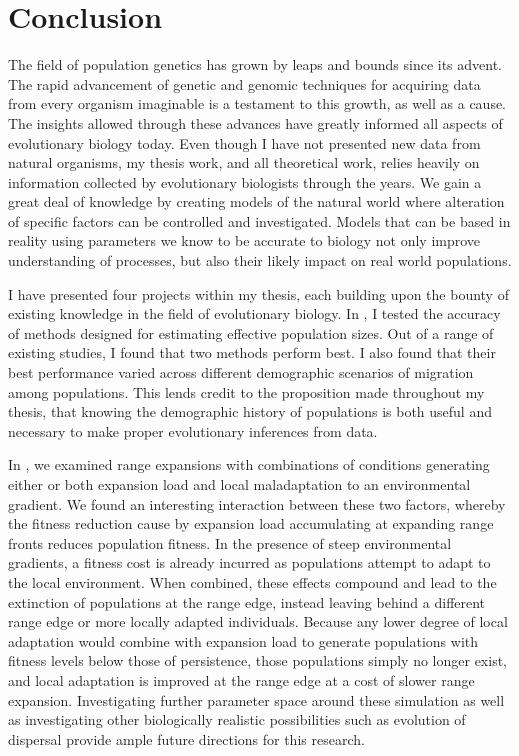 \chapter{Conclusion}
\label{chap:conclusions}

The field of population genetics has grown by leaps and bounds since its advent. The rapid advancement of genetic and genomic techniques for acquiring data from every organism imaginable is a testament to this growth, as well as a cause. The insights allowed through these advances have greatly informed all aspects of evolutionary biology today. Even though I have not presented new data from natural organisms, my thesis work, and all theoretical work, relies heavily on information collected by evolutionary biologists through the years. We gain a great deal of knowledge by creating models of the natural world where alteration of specific factors can be controlled and investigated. Models that can be based in reality using parameters we know to be accurate to biology not only improve understanding of processes, but also their likely impact on real world populations.

I have presented four projects within my thesis, each building upon the bounty of existing knowledge in the field of evolutionary biology. In , I tested the accuracy of methods designed for estimating effective population sizes. Out of a range of existing studies, I found that two methods perform best. I also found that their best performance varied across different demographic scenarios of migration among populations. This lends credit to the proposition made throughout my thesis, that knowing the demographic history of populations is both useful and necessary to make proper evolutionary inferences from data.

In , we examined range expansions with combinations of conditions generating either or both expansion load and local maladaptation to an environmental gradient. We found an interesting interaction between these two factors, whereby the fitness reduction cause by expansion load accumulating at expanding range fronts reduces population fitness. In the presence of steep environmental gradients, a fitness cost is already incurred as populations attempt to adapt to the local environment. When combined, these effects compound and lead to the extinction of populations at the range edge, instead leaving behind a different range edge or more locally adapted individuals. Because any lower degree of local adaptation would combine with expansion load to generate populations with fitness levels below those of persistence, those populations simply no longer exist, and local adaptation is improved at the range edge at a cost of slower range expansion. Investigating further parameter space around these simulation as well as investigating other biologically realistic possibilities such as evolution of dispersal provide ample future directions for this research.

